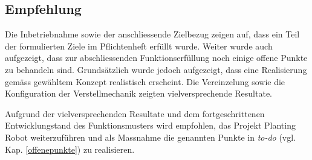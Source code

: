 \subsection{Empfehlung}

Die Inbetriebnahme sowie der anschliessende Zielbezug zeigen auf, dass ein Teil der formulierten Ziele im Pflichtenheft erfüllt wurde. Weiter wurde auch aufgezeigt, dass zur abschliessenden Funktionserfüllung noch einige offene Punkte zu behandeln sind. Grundsätzlich wurde jedoch aufgezeigt, dass eine Realisierung gemäss gewähltem Konzept realistisch erscheint. Die Vereinzelung sowie die Konfiguration der Verstellmechanik zeigten vielversprechende Resultate. 
\newline

Aufgrund der vielversprechenden Resultate und dem fortgeschrittenen Entwicklungstand des Funktionsmusters wird empfohlen, das Projekt Planting Robot weiterzuführen und als Massnahme die genannten Punkte in \textit{to-do} (vgl. Kap. \ref{offenepunkte}) zu realisieren.